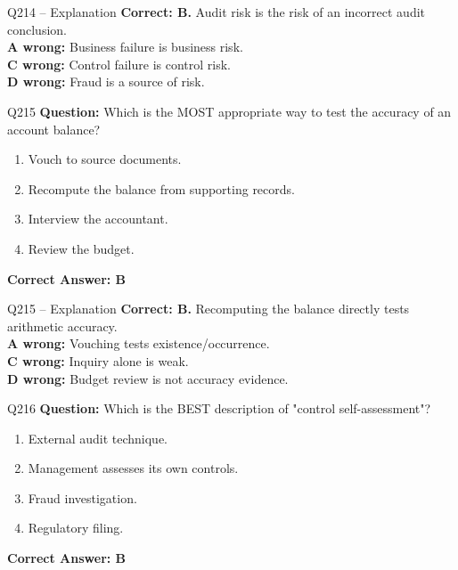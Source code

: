 \documentclass[aspectratio=169,10pt]{beamer}
\begin{document}
	\begin{frame}[t]{Q214 -- Explanation}
		\small
		\textbf{Correct: B.} Audit risk is the risk of an incorrect audit conclusion. \\[4pt]
		\textbf{A wrong:} Business failure is business risk. \\[2pt]
		\textbf{C wrong:} Control failure is control risk. \\[2pt]
		\textbf{D wrong:} Fraud is a source of risk.
	\end{frame}
	
	\begin{frame}[t]{Q215}
		\small
		\textbf{Question:} Which is the MOST appropriate way to test the accuracy of an account balance?
		\begin{enumerate}[label=\Alph*.,itemsep=1pt,topsep=2pt]
			\item Vouch to source documents.
			\item Recompute the balance from supporting records.
			\item Interview the accountant.
			\item Review the budget.
		\end{enumerate}
		\vspace{4pt}
		\textbf{Correct Answer: B}
	\end{frame}
	
	\begin{frame}[t]{Q215 -- Explanation}
		\small
		\textbf{Correct: B.} Recomputing the balance directly tests arithmetic accuracy. \\[4pt]
		\textbf{A wrong:} Vouching tests existence/occurrence. \\[2pt]
		\textbf{C wrong:} Inquiry alone is weak. \\[2pt]
		\textbf{D wrong:} Budget review is not accuracy evidence.
	\end{frame}
	
	\begin{frame}[t]{Q216}
		\small
		\textbf{Question:} Which is the BEST description of "control self-assessment"?
		\begin{enumerate}[label=\Alph*.,itemsep=1pt,topsep=2pt]
			\item External audit technique.
			\item Management assesses its own controls.
			\item Fraud investigation.
			\item Regulatory filing.
		\end{enumerate}
		\vspace{4pt}
		\textbf{Correct Answer: B}
	\end{frame}
	
\end{document}
